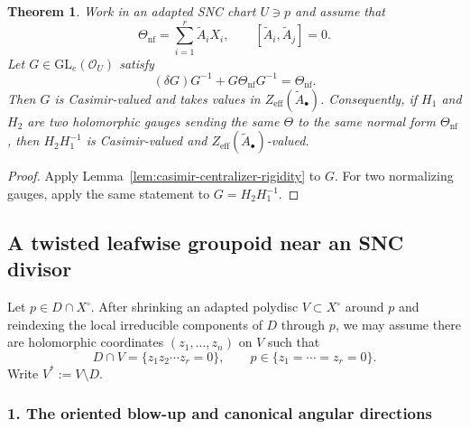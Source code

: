 \documentclass[11pt]{amsart}
\theoremstyle{plain}
\newtheorem{theorem}{Theorem}[section]
\theoremstyle{definition}
\newcommand{\GL}{\mathrm{GL}}
\theoremstyle{definition}
\newcommand{\OO}{\mathcal{O}}
\begin{document}
\begin{theorem} \label{thm:uniq}
Work in an adapted SNC chart $U\ni p$ and assume that
\[
        \Theta_{\mathrm{nf}}
        =
        \sum_{i=1}^r \widetilde A_iX_i,
        \qquad
        [\widetilde A_i,\widetilde A_j]=0.
\]
Let $G\in\GL_e(\OO_U)$ satisfy
\[
        (\delta G)G^{-1}+G\Theta_{\mathrm{nf}}G^{-1}=\Theta_{\mathrm{nf}}.
\]
Then $G$ is Casimir-valued and takes values in
$Z_{\mathrm{eff}}(\widetilde A_\bullet)$.  Consequently, if $H_1$ and $H_2$ are
two holomorphic gauges sending the same $\Theta$ to the same normal form
$\Theta_{\mathrm{nf}}$, then $H_2H_1^{-1}$ is Casimir-valued and
$Z_{\mathrm{eff}}(\widetilde A_\bullet)$-valued.
\end{theorem}

\begin{proof}
Apply Lemma~\ref{lem:casimir-centralizer-rigidity} to $G$.  For two normalizing
gauges, apply the same statement to $G=H_2H_1^{-1}$.
\end{proof}

\subsection{A twisted leafwise groupoid near an SNC divisor  }
\label{subsec:twisted-leafwise}

Let $p\in D\cap X^\circ$. After shrinking an adapted polydisc $V\subset X^\circ$ around $p$ and reindexing the
local irreducible components of $D$ through $p$, we may assume there are holomorphic coordinates
$(z_1,\dots,z_n)$ on $V$ such that
\begin{equation}\label{eq:SNC-local}
D\cap V=\{z_1 z_2\cdots z_r=0\},
\qquad
p\in \{z_1=\cdots=z_r=0\}.
\end{equation}
Write $V^*:=V\setminus D$.

\subsubsection*{1. The oriented blow-up and canonical angular directions}
\end{document}
